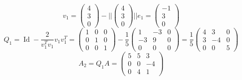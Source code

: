 \documentclass[10pt,a4paper]{article}
\DeclareMathOperator{\id}{Id}
\begin{document}
\begin{equation}
  v_{1} = \begin{pmatrix}
    4\\3\\0
  \end{pmatrix}
  - ||\begin{pmatrix}
    4\\3\\0
  \end{pmatrix}||e_{1} = \begin{pmatrix}
    -1\\3\\0
  \end{pmatrix}
\end{equation}
\begin{equation}
  Q_{1} = \id - \frac{2}{v_{1}^{T}v_{1}}v_{1}v_{1}^{T} =
  \begin{pmatrix}
    1 & 0 & 0\\
    0 & 1 & 0\\
    0 & 0 & 1
  \end{pmatrix}
  - \frac{1}{5} \begin{pmatrix}
    1 & -3 & 0\\
    -3 & 9 & 0\\
    0 & 0 & 0
  \end{pmatrix}
  =
  \frac{1}{5}
  \begin{pmatrix}
    4 & 3 & 0\\
    3 & -4 & 0\\
    0 & 0 & 5
  \end{pmatrix}
\end{equation}
\begin{equation}
  A_{2} = Q_{1}A = \begin{pmatrix}
    5 & 5 & 3\\
    0 & 0 & -4\\
    0 & 4 & 1
  \end{pmatrix}
\end{equation}
\end{document}
